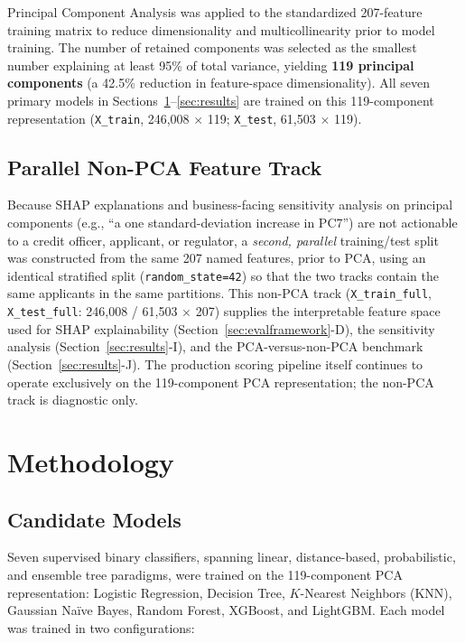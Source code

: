 \documentclass[journal]{IEEEtran}
\begin{document}
Principal Component Analysis was applied to the standardized 207-feature training matrix to reduce dimensionality and multicollinearity prior to model training. The number of retained components was selected as the smallest number explaining at least 95\% of total variance, yielding \textbf{119 principal components} (a 42.5\% reduction in feature-space dimensionality). All seven primary models in Sections~\ref{sec:methodology}--\ref{sec:results} are trained on this 119-component representation (\texttt{X\_train}, 246,008 $\times$ 119; \texttt{X\_test}, 61,503 $\times$ 119).

\subsection{Parallel Non-PCA Feature Track}

Because SHAP explanations and business-facing sensitivity analysis on principal components (e.g., ``a one standard-deviation increase in PC7'') are not actionable to a credit officer, applicant, or regulator, a \emph{second, parallel} training/test split was constructed from the same 207 named features, prior to PCA, using an identical stratified split (\texttt{random\_state=42}) so that the two tracks contain the same applicants in the same partitions. This non-PCA track (\texttt{X\_train\_full}, \texttt{X\_test\_full}: 246,008 / 61,503 $\times$ 207) supplies the interpretable feature space used for SHAP explainability (Section~\ref{sec:evalframework}-D), the sensitivity analysis (Section~\ref{sec:results}-I), and the PCA-versus-non-PCA benchmark (Section~\ref{sec:results}-J). The production scoring pipeline itself continues to operate exclusively on the 119-component PCA representation; the non-PCA track is diagnostic only.

\section{Methodology}
\label{sec:methodology}

\subsection{Candidate Models}

Seven supervised binary classifiers, spanning linear, distance-based, probabilistic, and ensemble tree paradigms, were trained on the 119-component PCA representation: Logistic Regression, Decision Tree, $K$-Nearest Neighbors (KNN), Gaussian Naïve Bayes, Random Forest, XGBoost, and LightGBM. Each model was trained in two configurations:
\end{document}
